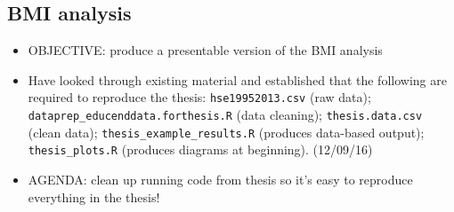 \documentclass[]{article}
\begin{document}
\subsection{BMI analysis}
\begin{itemize}
\item OBJECTIVE: produce a presentable version of the BMI analysis

\item Have looked through existing material and established that the following are required to reproduce the thesis: \texttt{hse19952013.csv} (raw data); \texttt{dataprep\_educenddata.forthesis.R} (data cleaning); \texttt{thesis.data.csv} (clean data); \texttt{thesis\_example\_results.R} (produces data-based output); \texttt{thesis\_plots.R} (produces diagrams at beginning). (12/09/16)

\item AGENDA: clean up running code from thesis so it's easy to reproduce everything in the thesis!


\end{itemize}
\end{document}
